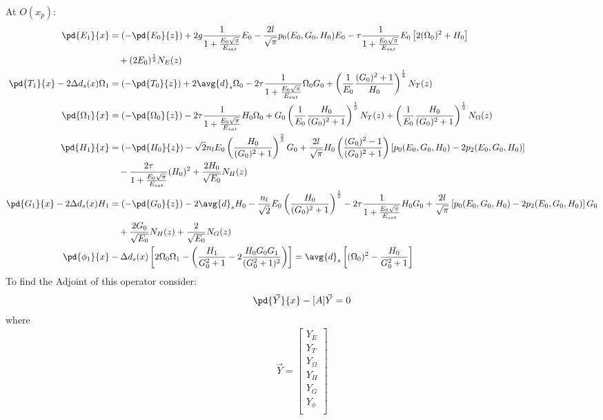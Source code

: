 At $O(x_p)$:
\begin{equation}
\begin{split}
\pd{E_1}{x} &= (-\pd{E_0}{z}) + 2g \frac{1}{1+\frac{E_0\sqrt{\pi}}{E_{sat}}} E_0 - \frac{2l}{\sqrt{\pi}} p_0(E_0,G_0,H_0) E_0 - \tau \frac{1}{1+\frac{E_0\sqrt{\pi}}{E_{sat}}} E_0 \left[2 (\Omega_0)^2 + H_0\right] \\
&\quad+ (2E_0)^{\frac{1}{2}}N_E(z) \\
\pd{T_1}{x}-2\Delta d_s(x) \Omega_1 &= (-\pd{T_0}{z}) + 2\avg{d}_s \Omega_0 - 2 \tau \frac{1}{1+\frac{E_0\sqrt{\pi}}{E_{sat}}} \Omega_0 G_0 + \left(\frac{1}{E_0}\frac{(G_0)^2+1}{H_0}\right)^{\frac{1}{2}} N_T(z)\\
\pd{\Omega_1}{x} &= (-\pd{\Omega_0}{z}) - 2 \tau \frac{1}{1+\frac{E_0\sqrt{\pi}}{E_{sat}}} H_0 \Omega_0 + G_0\left(\frac{1}{E_0}\frac{H_0}{(G_0)^2+1}\right)^{\frac{1}{2}} N_T(z) + \left(\frac{1}{E_0}\frac{H_0}{(G_0)^2+1}\right)^{\frac{1}{2}}N_\Omega(z)\\
\pd{H_1}{x} &= (-\pd{H_0}{z}) - \sqrt{2}n_{l}E_0 \left(\frac{H_0}{(G_0)^2+1}\right)^{\frac{2}{3}} G_0 + \frac{2l}{\sqrt{\pi}}H_0 \left(\frac{(G_0)^2-1}{(G_0)^2+1}\right) \left[p_0(E_0,G_0,H_0) - 2p_2(E_0,G_0,H_0)\right] \\
&\quad - \frac{2\tau}{1+\frac{E_0 \sqrt{\pi}}{E_{sat}}} (H_0)^2  + \frac{2H_0}{\sqrt{E_0}} N_H(z)\\
\pd{G_1}{x}- 2\Delta d_s(x) H_1 &= (-\pd{G_0}{z}) - 2 \avg{d}_s H_0 - \frac{n_{l}}{\sqrt{2}}E_0 \left(\frac{H_0}{(G_0)^2+1}\right)^{\frac{1}{2}} - 2\tau\frac{1}{1+\frac{E_0 \sqrt{\pi}}{E_{sat}}} H_0 G_0 + \frac{2l}{\sqrt{\pi}}\left[p_0(E_0,G_0,H_0) - 2p_2(E_0,G_0,H_0)\right]G_0 \\
&\quad+ \frac{2G_0}{\sqrt{E_0}} N_H(z) + \frac{2}{\sqrt{E_0}} N_G(z) \\
\pd{\phi_1}{x} &- \Delta d_s(x) \left[2\Omega_0 \Omega_1- \left( \frac{H_1}{G_0^2+1} - 2\frac{H_0 G_0 G_1}{(G_0^2+1)^2}\right)\right] =  \avg{d}_s \left[(\Omega_0)^2 -\frac{H_0}{G_0^2+1}  \right]\\
\end{split}
\end{equation}
To find the Adjoint of this operator consider:
\begin{equation}
\begin{split}
\pd{\vec{Y}}{x} -  [A]\vec{Y} = 0\\
\end{split}
\end{equation}
where 
\begin{align}
\vec{Y} = \left[\begin{array}{c}
Y_E      \\ 
Y_T      \\
Y_\Omega \\
Y_H      \\
Y_G      \\ 
Y_\phi   \\
\end{array}\right]
 \end{align}
